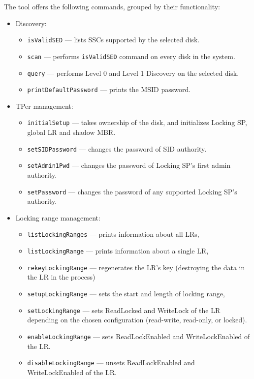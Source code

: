 The tool offers the following commands, grouped by their functionality:
\begin{itemize}
    \item Discovery: \begin{itemize}
\item \verb|isValidSED| --- lists SSCs supported by the selected disk.
\item \verb|scan| --- performs \verb|isValidSED| command on every disk in the system.
\item \verb|query| --- performs Level 0 and Level 1 Discovery on the selected disk.
\item \verb|printDefaultPassword| --- prints the MSID password.
    \end{itemize}
    
    \item TPer management: \begin{itemize}
\item \verb|initialSetup| --- takes ownership of the disk, and initializes Locking SP, global LR and shadow MBR.
\item \verb|setSIDPassword| --- changes the password of SID authority.
\item \verb|setAdmin1Pwd| --- changes the password of Locking SP's first admin authority. 
\item \verb|setPassword| --- changes the password of any supported Locking SP's authority.
    \end{itemize}
    
    \item Locking range management: \begin{itemize}
\item \verb|listLockingRanges| --- prints information about all LRs,
\item \verb|listLockingRange| --- prints information about a single LR,
\item \verb|rekeyLockingRange| --- regenerates the LR's key (destroying the data in the LR in the process)
\item \verb|setupLockingRange| --- sets the start and length of locking range,
\item \verb|setLockingRange| --- sets ReadLocked and WriteLock of the LR depending on the chosen configuration (read-write, read-only, or locked).
\item \verb|enableLockingRange| --- sets ReadLockEnabled and WriteLockEnabled of the LR. 
\item \verb|disableLockingRange| --- unsets ReadLockEnabled and WriteLockEnabled of the LR. 
    \end{itemize}
    

\end{itemize}

